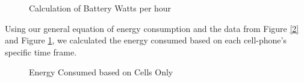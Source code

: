 \documentclass{article}
\begin{document}
\begin{figure}[!ht]
    \caption{Calculation of Battery Watts per hour}
    \label{3}
\end{figure}

Using our general equation of energy consumption and the data from Figure \ref{2} and Figure \ref{3}, we calculated the energy consumed based on each cell-phone's specific time frame.

\begin{figure}[!ht]
    \caption{Energy Consumed based on Cells Only}
    \label{4}
\end{figure}
\end{document}
